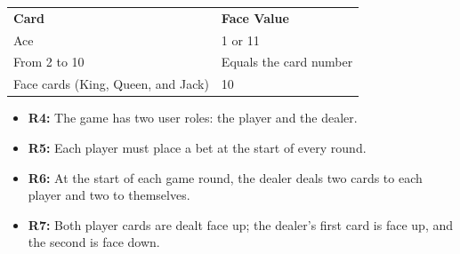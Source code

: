\begin{center}
{\def\LTcaptype{none} %
\begin{longtable}[]{@{}
>{\raggedright\arraybackslash} p{}
>{\raggedright\arraybackslash} p{}@{}}
\toprule\noalign{}
\endhead
\bottomrule\noalign{}
\endlastfoot
\begin{minipage}[t]{\linewidth}\raggedright
\textbf{Card}
\end{minipage} & \begin{minipage}[t]{\linewidth}\raggedright
\textbf{Face Value}
\end{minipage} \\
\begin{minipage}[t]{\linewidth}\raggedright
Ace
\end{minipage} & \begin{minipage}[t]{\linewidth}\raggedright
1 or 11
\end{minipage} \\
\begin{minipage}[t]{\linewidth}\raggedright
From 2 to 10
\end{minipage} & \begin{minipage}[t]{\linewidth}\raggedright
Equals the card number
\end{minipage} \\
\begin{minipage}[t]{\linewidth}\raggedright
Face cards (King, Queen, and Jack)
\end{minipage} & \begin{minipage}[t]{\linewidth}\raggedright
10
\end{minipage} \\
\end{longtable}
}
\end{center}

\begin{itemize}
\item
\textbf{R4:} The game has two user roles: the player and the dealer.
\item
\textbf{R5:} Each player must place a bet at the start of every round.
\item
\textbf{R6:} At the start of each game round, the dealer deals two cards to each player and two to themselves.
\item
\protect{}\label{oobzkSQNZf5JRVX0Xv33G}
\textbf{R7:} Both player cards are dealt face up; the dealer's first card is face up, and the second is face down.
\end{itemize}

